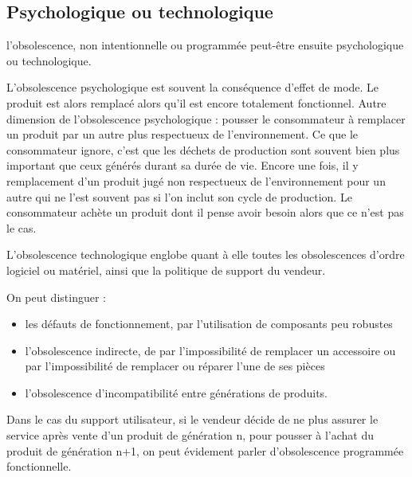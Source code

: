 \subsection{Psychologique ou technologique}

l’obsolescence, non intentionnelle ou programmée peut-être ensuite psychologique ou technologique. 

\bigbreak
L’obsolescence psychologique est souvent la conséquence d’effet de mode. Le produit est alors remplacé alors qu’il est encore totalement fonctionnel. Autre dimension de l’obsolescence psychologique : pousser le consommateur à remplacer un produit par un autre plus respectueux de l’environnement.
Ce que le consommateur ignore, c’est que les déchets de production sont souvent bien plus important que ceux générés durant sa durée de vie. Encore une fois, il y remplacement d’un produit jugé non respectueux de l’environnement pour un autre qui ne l’est souvent pas si l’on inclut son cycle de production. Le consommateur achète un produit dont il pense avoir besoin alors que ce n'est pas le cas.

\medbreak
L’obsolescence technologique englobe quant à elle toutes les obsolescences d’ordre logiciel ou matériel, ainsi que la politique de support du vendeur. 

On peut distinguer :
\begin{itemize}
  \item les défauts de fonctionnement, par l’utilisation de composants peu robustes
  \item l’obsolescence indirecte, de par l'impossibilité de remplacer un accessoire ou par l’impossibilité de remplacer ou réparer l’une de ses pièces
  \item l’obsolescence d’incompatibilité entre générations de produits.
\end{itemize}


\bigbreak
Dans le cas du support utilisateur, si le vendeur décide de ne plus assurer le service après vente d’un produit de génération n, pour pousser à l’achat du produit de génération n+1, on peut évidement parler d'obsolescence programmée fonctionnelle.
